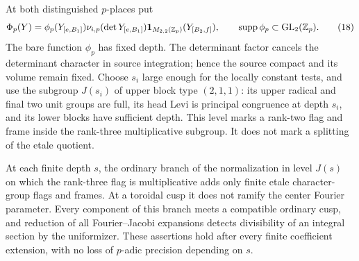 At both distinguished $p$-places put
\begin{equation}
 \Phi_p(Y)=\phi_p(Y_{[e,B_1]})
      \nu_{i,p}(\det Y_{[e,B_1]})
      \mathbf 1_{M_{2,2}(\mathbb Z_p)}(Y_{[B_2,f]}),
 \qquad \operatorname{supp}\phi_p\subset\mathrm{GL}_2(\mathbb Z_p).
 \tag{18}\label{eq:source-18}
\end{equation}
The bare function $\phi_p$ has fixed depth.  The determinant factor
cancels the determinant character in source integration; hence the
source compact and its volume remain fixed.  Choose $s_i$ large
enough for the locally constant tests, and use the subgroup $J(s_i)$
of upper block type $(2,1,1)$: its upper radical and final two unit
groups are full, its head Levi is principal congruence at depth
$s_i$, and its lower blocks have sufficient depth.  This level marks
a rank-two flag and frame inside the rank-three multiplicative
subgroup.  It does not mark a splitting of the etale quotient.

\begin{lemma}\label{theta:canonical-levels}
At each finite depth $s$, the ordinary branch of the normalization
in level $J(s)$ on which the rank-three flag is multiplicative adds
only finite etale character-group flags and frames.  At a toroidal
cusp it does not ramify the center Fourier parameter.  Every
component of this branch meets a compatible ordinary cusp, and
reduction of all Fourier--Jacobi expansions detects divisibility of
an integral section by the uniformizer.  These assertions hold
after every finite coefficient extension, with no loss of $p$-adic
precision depending on $s$.
\end{lemma}

